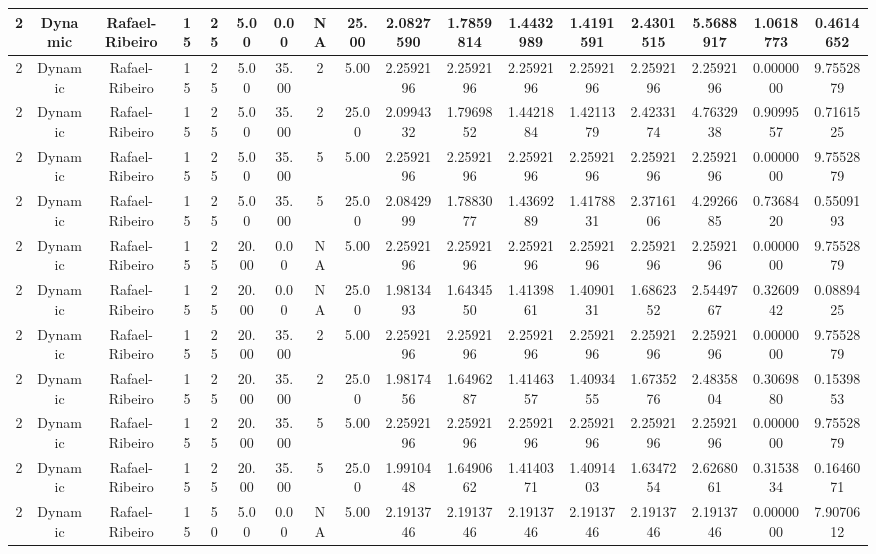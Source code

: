 \documentclass[a4paper]{article}
\begin{document}
\begin{center}
\begin{tabular}{ | c | c | c | c | c | c | c | c | c | c | c | c | c | c | c | c | c | }
		\hline
		2	&	Dynamic	&	Rafael-Ribeiro	&	15	&	25	&	5.00	&	0.00	&	NA	&	25.00	&	2.0827590	&	1.7859814	&	1.4432989	&	1.4191591	&	2.4301515	&	5.5688917	&	1.0618773	&	0.4614652 \\
		\hline
		2	&	Dynamic	&	Rafael-Ribeiro	&	15	&	25	&	5.00	&	35.00	&	2	&	5.00	&	2.2592196	&	2.2592196	&	2.2592196	&	2.2592196	&	2.2592196	&	2.2592196	&	0.0000000	&	9.7552879 \\
		\hline
		2	&	Dynamic	&	Rafael-Ribeiro	&	15	&	25	&	5.00	&	35.00	&	2	&	25.00	&	2.0994332	&	1.7969852	&	1.4421884	&	1.4211379	&	2.4233174	&	4.7632938	&	0.9099557	&	0.7161525 \\
		\hline
		2	&	Dynamic	&	Rafael-Ribeiro	&	15	&	25	&	5.00	&	35.00	&	5	&	5.00	&	2.2592196	&	2.2592196	&	2.2592196	&	2.2592196	&	2.2592196	&	2.2592196	&	0.0000000	&	9.7552879 \\
		\hline
		2	&	Dynamic	&	Rafael-Ribeiro	&	15	&	25	&	5.00	&	35.00	&	5	&	25.00	&	2.0842999	&	1.7883077	&	1.4369289	&	1.4178831	&	2.3716106	&	4.2926685	&	0.7368420	&	0.5509193 \\
		\hline
		2	&	Dynamic	&	Rafael-Ribeiro	&	15	&	25	&	20.00	&	0.00	&	NA	&	5.00	&	2.2592196	&	2.2592196	&	2.2592196	&	2.2592196	&	2.2592196	&	2.2592196	&	0.0000000	&	9.7552879 \\
		\hline
		2	&	Dynamic	&	Rafael-Ribeiro	&	15	&	25	&	20.00	&	0.00	&	NA	&	25.00	&	1.9813493	&	1.6434550	&	1.4139861	&	1.4090131	&	1.6862352	&	2.5449767	&	0.3260942	&	0.0889425 \\
		\hline
		2	&	Dynamic	&	Rafael-Ribeiro	&	15	&	25	&	20.00	&	35.00	&	2	&	5.00	&	2.2592196	&	2.2592196	&	2.2592196	&	2.2592196	&	2.2592196	&	2.2592196	&	0.0000000	&	9.7552879 \\
		\hline
		2	&	Dynamic	&	Rafael-Ribeiro	&	15	&	25	&	20.00	&	35.00	&	2	&	25.00	&	1.9817456	&	1.6496287	&	1.4146357	&	1.4093455	&	1.6735276	&	2.4835804	&	0.3069880	&	0.1539853 \\
		\hline
		2	&	Dynamic	&	Rafael-Ribeiro	&	15	&	25	&	20.00	&	35.00	&	5	&	5.00	&	2.2592196	&	2.2592196	&	2.2592196	&	2.2592196	&	2.2592196	&	2.2592196	&	0.0000000	&	9.7552879 \\
		\hline
		2	&	Dynamic	&	Rafael-Ribeiro	&	15	&	25	&	20.00	&	35.00	&	5	&	25.00	&	1.9910448	&	1.6490662	&	1.4140371	&	1.4091403	&	1.6347254	&	2.6268061	&	0.3153834	&	0.1646071 \\
		\hline
		2	&	Dynamic	&	Rafael-Ribeiro	&	15	&	50	&	5.00	&	0.00	&	NA	&	5.00	&	2.1913746	&	2.1913746	&	2.1913746	&	2.1913746	&	2.1913746	&	2.1913746	&	0.0000000	&	7.9070612 \\
		\hline

\end{tabular}
\end{center}
\end{document}
